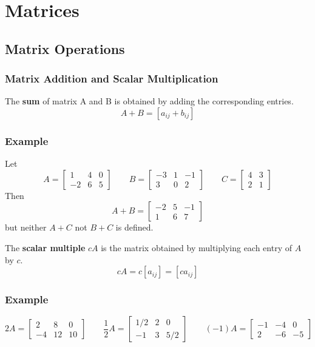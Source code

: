 \chapter{Matrices}

\section{Matrix Operations}

\subsection*{Matrix Addition and Scalar Multiplication}
The \textbf{sum} of matrix A and B is obtained by adding the corresponding entries.
\[A+B=[a_{ij}+b_{ij}]\]

\subsection*{Example}
Let
\[
    A=\begin{bmatrix}
        1  & 4 & 0 \\
        -2 & 6 & 5
    \end{bmatrix} \qquad B=\begin{bmatrix}
        -3 & 1 & -1 \\
        3  & 0 & 2
    \end{bmatrix} \qquad C=\begin{bmatrix}
        4 & 3 \\
        2 & 1
    \end{bmatrix}
\]
Then
\[A+B=\begin{bmatrix}
        -2 & 5 & -1 \\
        1  & 6 & 7
    \end{bmatrix}\]
but neither $A+C$ not $B+C$ is defined.

The \textbf{scalar multiple} $cA$ is the matrix obtained by multiplying each
entry of $A$ by $c$.
\[cA=c[a_{ij}]=[ca_{ij}]\]

\subsection*{Example}
\[
    2A=\begin{bmatrix}
        2  & 8  & 0  \\
        -4 & 12 & 10
    \end{bmatrix} \qquad
    \frac{1}{2}A=\begin{bmatrix}
        1/2 & 2 & 0   \\
        -1  & 3 & 5/2
    \end{bmatrix} \qquad
    (-1)A=\begin{bmatrix}
        -1 & -4 & 0  \\
        2  & -6 & -5
    \end{bmatrix}
\]

